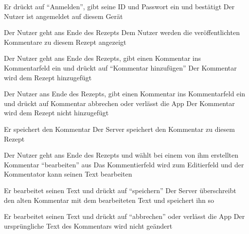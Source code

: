 
{Er drückt auf "`Anmelden"', gibt seine ID und Passwort ein und bestätigt}
{Der Nutzer ist angemeldet auf diesem Gerät}


{Der Nutzer geht ans Ende des Rezepts}
{Dem Nutzer werden die veröffentlichten Kommentare zu diesem Rezept angezeigt}

{Der Nutzer geht ans Ende des Rezepts, gibt einen Kommentar ins Kommentarfeld ein und drückt auf "`Kommentar hinzufügen"'}
{Der Kommentar wird dem Rezept hinzugefügt}

{Der Nutzer ans Ende des Rezepts, gibt einen Kommentar ins Kommentarfeld ein und drückt auf Kommentar abbrechen oder verlässt die App}
{Der Kommentar wird dem Rezept nicht hinzugefügt}

{Er speichert den Kommentar}
{Der Server speichert den Kommentar zu diesem Rezept}



{Der Nutzer geht ans Ende des Rezepts und wählt bei einem von ihm erstellten Kommentar "`bearbeiten"' aus}
{Das Kommentierfeld wird zum Editierfeld und der Kommentator kann seinen Text bearbeiten}

{Er bearbeitet seinen Text und drückt auf "`speichern"'}
{Der Server überschreibt den alten Kommentar mit dem bearbeiteten Text und speichert ihn so}

{Er bearbeitet seinen Text und drückt auf "`abbrechen"' oder verlässt die App}
{Der ursprüngliche Text des Kommentars wird nicht geändert}


